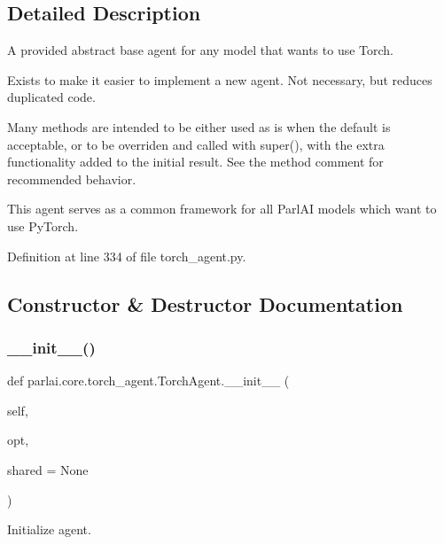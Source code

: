 \subsection{Detailed Description}
\begin{DoxyVerb}A provided abstract base agent for any model that wants to use Torch.

Exists to make it easier to implement a new agent.
Not necessary, but reduces duplicated code.

Many methods are intended to be either used as is when the default is
acceptable, or to be overriden and called with super(), with the extra
functionality added to the initial result. See the method comment for
recommended behavior.

This agent serves as a common framework for all ParlAI models which want
to use PyTorch.
\end{DoxyVerb}
 

Definition at line 334 of file torch\+\_\+agent.\+py.



\subsection{Constructor \& Destructor Documentation}
\mbox{\label{classparlai_1_1core_1_1torch__agent_1_1TorchAgent_ad0a00ada1fcd5b7ceec27b1a6cbdc281}} 
\subsubsection{\texorpdfstring{\+\_\+\+\_\+init\+\_\+\+\_\+()}{\_\_init\_\_()}}
{\footnotesize\ttfamily def parlai.\+core.\+torch\+\_\+agent.\+Torch\+Agent.\+\_\+\+\_\+init\+\_\+\+\_\+ (\begin{DoxyParamCaption}\item[{}]{self,  }\item[{}]{opt,  }\item[{}]{shared = {\ttfamily None} }\end{DoxyParamCaption})}

\begin{DoxyVerb}Initialize agent.
\end{DoxyVerb}
 

